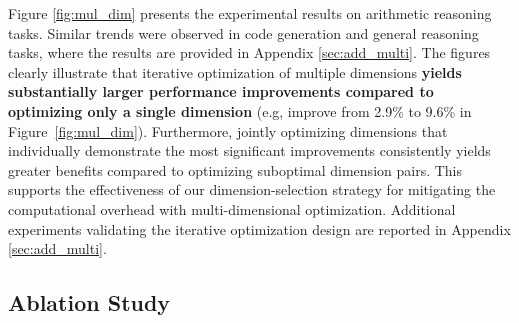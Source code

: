 


Figure \ref{fig:mul_dim} presents the experimental results on arithmetic reasoning tasks. Similar trends were observed in code generation and general reasoning tasks, where the results are provided in Appendix \ref{sec:add_multi}. The figures clearly illustrate that iterative optimization of multiple dimensions \textbf{yields substantially larger performance improvements compared to optimizing only a single dimension} (e.g, improve from 2.9\% to 9.6\% in Figure~\ref{fig:mul_dim}). Furthermore, jointly optimizing dimensions that individually demonstrate the most significant improvements consistently yields greater benefits compared to optimizing suboptimal dimension pairs. This supports the effectiveness of our dimension-selection strategy for mitigating the computational overhead with multi-dimensional optimization. Additional experiments validating the iterative optimization design are reported in Appendix \ref{sec:add_multi}.










\subsection{Ablation Study}\label{sec:ablation}




